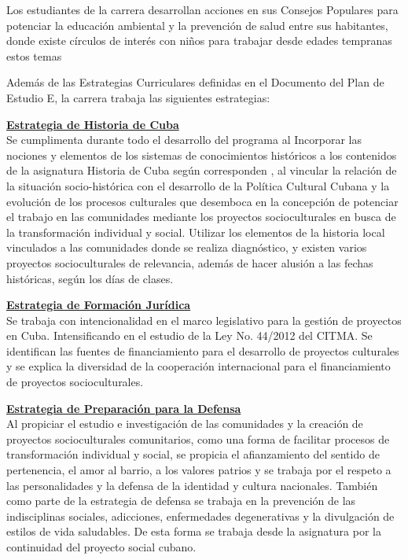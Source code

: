 Los estudiantes de la carrera desarrollan acciones en sus Consejos Populares para potenciar la educación ambiental y la prevención de salud entre sus habitantes, donde existe círculos de interés con niños para trabajar desde edades tempranas estos temas

Además de las Estrategias Curriculares definidas en el Documento del Plan de Estudio E, la carrera trabaja las siguientes estrategias:

\underline{\textbf{Estrategia de Historia de Cuba}}\\
Se cumplimenta durante todo el desarrollo del programa al Incorporar las nociones y elementos de los sistemas de conocimientos históricos a los contenidos de la asignatura Historia de Cuba según corresponden , al vincular la relación de la situación socio-histórica con el desarrollo de la Política Cultural Cubana y la evolución de los procesos culturales que desemboca en la concepción de potenciar el trabajo en las comunidades mediante los proyectos socioculturales en busca de la transformación individual y social. Utilizar los elementos de la historia local vinculados a las comunidades donde se realiza diagnóstico, y existen varios proyectos socioculturales de relevancia, además de hacer alusión a las fechas históricas, según los días de clases.

\underline{\textbf{Estrategia de Formación Jurídica}}\\
Se trabaja con intencionalidad en el marco legislativo para la gestión de proyectos en Cuba. Intensificando en el estudio de la Ley No. 44/2012 del CITMA. Se identifican las fuentes de financiamiento para el desarrollo de proyectos culturales y se explica la diversidad de la cooperación internacional para el financiamiento de proyectos socioculturales.

\underline{\textbf{Estrategia de Preparación para la Defensa}}\\
Al propiciar el estudio e investigación de las comunidades y la creación de proyectos socioculturales comunitarios, como una forma de facilitar procesos de transformación individual y social, se propicia el afianzamiento del sentido de pertenencia, el amor al barrio, a los valores patrios y se trabaja por el respeto a las personalidades y la defensa de la identidad y cultura nacionales. También como parte de la estrategia de defensa se trabaja en la prevención de las indisciplinas sociales, adicciones, enfermedades degenerativas y la divulgación de estilos de vida saludables. De esta forma se trabaja desde la asignatura por la continuidad del proyecto social cubano.

